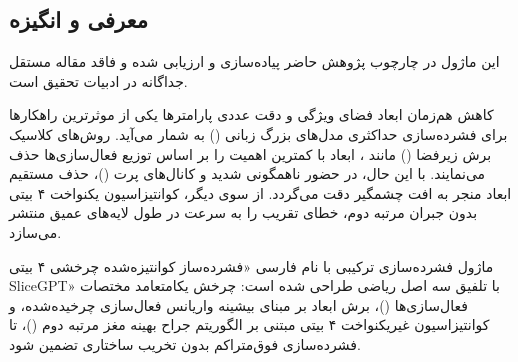 \subsection{معرفی و انگیزه}
این ماژول در چارچوب پژوهش حاضر پیاده‌سازی و ارزیابی شده و فاقد مقاله مستقل جداگانه در ادبیات تحقیق است.

کاهش هم‌زمان ابعاد فضای ویژگی و دقت عددی پارامترها یکی از موثرترین راهکارها برای فشرده‌سازی حداکثری مدل‌های بزرگ زبانی () به شمار می‌آید. روش‌های کلاسیک برش زیرفضا () مانند ، ابعاد با کمترین اهمیت را بر اساس توزیع فعال‌سازی‌ها حذف می‌نمایند. با این حال، در حضور ناهمگونی شدید و کانال‌های پرت ()، حذف مستقیم ابعاد منجر به افت چشمگیر دقت می‌گردد. از سوی دیگر، کوانتیزاسیون یکنواخت ۴ بیتی بدون جبران مرتبه دوم، خطای تقریب را به سرعت در طول لایه‌های عمیق منتشر می‌سازد.

ماژول فشرده‌سازی ترکیبی  با نام فارسی «فشرده‌ساز کوانتیزه‌شده چرخشی ۴ بیتی SliceGPT» با تلفیق سه اصل ریاضی طراحی شده است: چرخش یکامتعامد مختصات فعال‌سازی‌ها ()، برش ابعاد بر مبنای بیشینه واریانس فعال‌سازی چرخیده‌شده، و کوانتیزاسیون غیریکنواخت ۴ بیتی مبتنی بر الگوریتم جراح بهینه مغز مرتبه دوم ()، تا فشرده‌سازی فوق‌متراکم بدون تخریب ساختاری تضمین شود.
